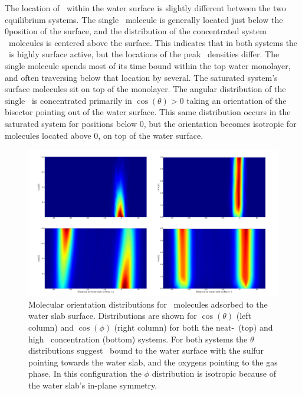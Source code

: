 The location of \suldiox~within the water surface is slightly different between the two equilibrium systems. The single \suldiox~molecule is generally located just below the 0\angs position of the surface, and the distribution of the concentrated system \suldiox~molecules is centered above the surface. This indicates that in both systems the \suldiox~is highly surface active, but the locations of the peak \suldiox~densities differ. The single molecule spends most of its time bound within the top water monolayer, and often traversing below that location by several\angs. The saturated system's surface molecules sit on top of the monolayer. The angular distribution of the single \suldiox~is concentrated primarily in $\cos(\theta)>0$ taking an orientation of the bisector pointing out of the water surface. This same distribution occurs in the saturated system for positions below 0\angs, but the orientation becomes isotropic for molecules located above 0\angs, on top of the water surface.


\begin{figure}[h!]
	\begin{center}
		\includegraphics[scale=1.0]{images/so2orientationsmall.png}
		\caption{Molecular orientation distributions for \suldiox~molecules adsorbed to the water slab surface. Distributions are shown for $\cos(\theta)$ (left column) and $\cos(\phi)$ (right column) for both the neat-\wat~(top) and high \suldiox~concentration (bottom) systems. For both systems the $\theta$ distributions suggest \suldiox~bound to the water surface with the sulfur pointing towards the water slab, and the oxygens pointing to the gas phase. In this configuration the $\phi$ distribution is isotropic because of the water slab's in-plane symmetry.}
		\label{fig:so2-orientation}
	\end{center}
\end{figure}
